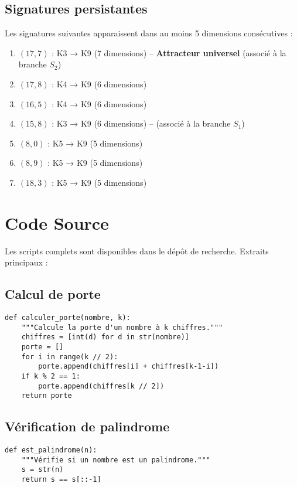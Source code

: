 \documentclass[12pt,a4paper]{article}
\theoremstyle{remark}
\begin{document}
\subsection{Signatures persistantes}

Les signatures suivantes apparaissent dans au moins 5 dimensions consécutives :

\begin{enumerate}
\item $(17, 7)$ : K3 → K9 (7 dimensions) -- \textbf{Attracteur universel} (associé à la branche $S_2$)
\item $(17, 8)$ : K4 → K9 (6 dimensions)
\item $(16, 5)$ : K4 → K9 (6 dimensions)
\item $(15, 8)$ : K3 → K9 (6 dimensions) -- (associé à la branche $S_1$)
\item $(8, 0)$ : K5 → K9 (5 dimensions)
\item $(8, 9)$ : K5 → K9 (5 dimensions)
\item $(18, 3)$ : K5 → K9 (5 dimensions)
\end{enumerate}

\section{Code Source}
\label{app:code}

Les scripts complets sont disponibles dans le dépôt de recherche. Extraits principaux :

\subsection{Calcul de porte}

\begin{verbatim}
def calculer_porte(nombre, k):
    """Calcule la porte d'un nombre à k chiffres."""
    chiffres = [int(d) for d in str(nombre)]
    porte = []
    for i in range(k // 2):
        porte.append(chiffres[i] + chiffres[k-1-i])
    if k % 2 == 1:
        porte.append(chiffres[k // 2])
    return porte
\end{verbatim}

\subsection{Vérification de palindrome}

\begin{verbatim}
def est_palindrome(n):
    """Vérifie si un nombre est un palindrome."""
    s = str(n)
    return s == s[::-1]
\end{verbatim}
\end{document}
